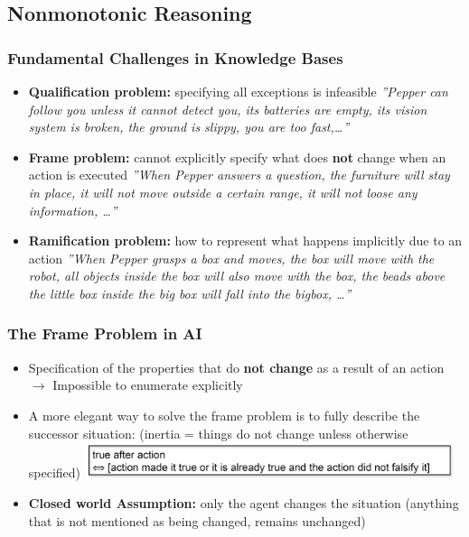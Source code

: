 \documentclass[conference, a4paper]{styles/acmsiggraph}
\begin{document}
    
    \subsection{Nonmonotonic Reasoning}
        \subsubsection{Fundamental Challenges in Knowledge Bases}
            \begin{itemize}
                \item \textbf{Qualification problem:} specifying all exceptions is infeasible\newline
                    \textit{''Pepper can follow you unless it cannot detect you, its batteries are empty, its vision system is broken, the ground is slippy, you are too fast,…''}
                \item \textbf{Frame problem:} cannot explicitly specify what does \textbf{not} change when an action is executed\newline
                    \textit{''When Pepper answers a question, the furniture will stay in place, it will not move outside a certain range, it will not loose any information, …''}
                \item \textbf{Ramification problem:} how to represent what happens implicitly due to an action
                    \textit{''When Pepper grasps a box and moves, the box will move with the robot, all objects inside the box will also move with the box, the beads above the little box inside the big box will fall into the bigbox, …''}
            \end{itemize}
        
        \subsubsection{The Frame Problem in AI}
            \begin{itemize}
                \item Specification of the properties that do \textbf{not change} as a result of an action\newline
                    $\rightarrow$ Impossible to enumerate explicitly
                \item A more elegant way to solve the frame problem is to fully describe the successor situation: (inertia = things do not change unless otherwise specified)\newline
                    \includegraphics[width=0.85\textwidth]{imgs/FrameProblemInAI.png}
                \item \textbf{Closed world Assumption:} only the agent changes the situation (anything that is not mentioned as being changed, remains unchanged)
            \end{itemize}
    
\end{document}
